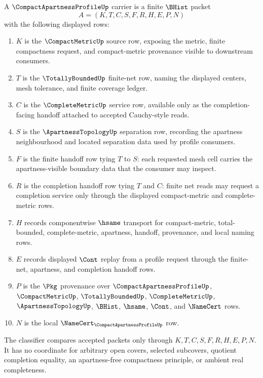 \begin{definition}
\label{def:compact-apartness-profile-carrier}
A $\CompactApartnessProfileUp$ carrier is a finite $\BHist$ packet
$$
A=(K,T,C,S,F,R,H,E,P,N)
$$
with the following displayed rows:
\begin{enumerate}
\item $K$ is the $\CompactMetricUp$ source row, exposing the metric, finite compactness request, and compact-metric provenance visible to downstream consumers.
\item $T$ is the $\TotallyBoundedUp$ finite-net row, naming the displayed centers, mesh tolerance, and finite coverage ledger.
\item $C$ is the $\CompleteMetricUp$ service row, available only as the completion-facing handoff attached to accepted Cauchy-style reads.
\item $S$ is the $\ApartnessTopologyUp$ separation row, recording the apartness neighbourhood and located separation data used by profile consumers.
\item $F$ is the finite handoff row tying $T$ to $S$: each requested mesh cell carries the apartness-visible boundary data that the consumer may inspect.
\item $R$ is the completion handoff row tying $T$ and $C$: finite net reads may request a completion service only through the displayed compact-metric and complete-metric rows.
\item $H$ records componentwise $\hsame$ transport for compact-metric, total-bounded, complete-metric, apartness, handoff, provenance, and local naming rows.
\item $E$ records displayed $\Cont$ replay from a profile request through the finite-net, apartness, and completion handoff rows.
\item $P$ is the $\Pkg$ provenance over $\CompactApartnessProfileUp$, $\CompactMetricUp$, $\TotallyBoundedUp$, $\CompleteMetricUp$, $\ApartnessTopologyUp$, $\BHist$, $\hsame$, $\Cont$, and $\NameCert$ rows.
\item $N$ is the local $\NameCert_{\CompactApartnessProfileUp}$ row.
\end{enumerate}
The classifier compares accepted packets only through $K,T,C,S,F,R,H,E,P,N$. It has no coordinate for arbitrary open covers, selected subcovers, quotient completion equality, an apartness-free compactness principle, or ambient real completeness.
\end{definition}

